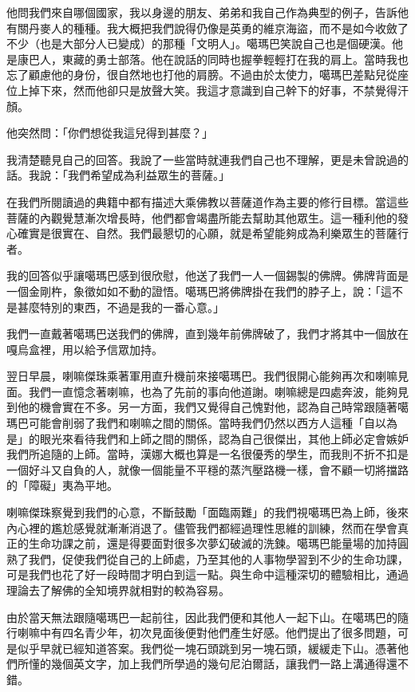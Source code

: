 他問我們來自哪個國家，我以身邊的朋友、弟弟和我自己作為典型的例子，告訴他有關丹麥人的種種。我大概把我們說得仍像是英勇的維京海盜，而不是如今收斂了不少（也是大部分人已變成）的那種「文明人」。噶瑪巴笑說自己也是個硬漢。他是康巴人，東藏的勇士部落。他在說話的同時也握拳輕輕打在我的肩上。當時我也忘了顧慮他的身份，很自然地也打他的肩膀。不過由於太使力，噶瑪巴差點兒從座位上掉下來，然而他卻只是放聲大笑。我這才意識到自己幹下的好事，不禁覺得汗顏。

他突然問：「你們想從我這兒得到甚麼？」

我清楚聽見自己的回答。我說了一些當時就連我們自己也不理解，更是未曾說過的話。我說：「我們希望成為利益眾生的菩薩。」

在我們所閱讀過的典籍中都有描述大乘佛教以菩薩道作為主要的修行目標。當這些菩薩的內觀覺慧漸次增長時，他們都會竭盡所能去幫助其他眾生。這一種利他的發心確實是很實在、自然。我們最懇切的心願，就是希望能夠成為利樂眾生的菩薩行者。

我的回答似乎讓噶瑪巴感到很欣慰，他送了我們一人一個錫製的佛牌。佛牌背面是一個金剛杵，象徵如如不動的證悟。噶瑪巴將佛牌掛在我們的脖子上，說：「這不是甚麼特別的東西，不過是我的一番心意。」

我們一直戴著噶瑪巴送我們的佛牌，直到幾年前佛牌破了，我們才將其中一個放在嘎烏盒裡，用以給予信眾加持。

翌日早晨，喇嘛傑珠乘著軍用直升機前來接噶瑪巴。我們很開心能夠再次和喇嘛見面。我們一直憶念著喇嘛，也為了先前的事向他道謝。喇嘛總是四處奔波，能夠見到他的機會實在不多。另一方面，我們又覺得自己愧對他，認為自己時常跟隨著噶瑪巴可能會削弱了我們和喇嘛之間的關係。當時我們仍然以西方人這種「自以為是」的眼光來看待我們和上師之間的關係，認為自己很傑出，其他上師必定會嫉妒我們所追隨的上師。當時，漢娜大概也算是一名很優秀的學生，而我則不折不扣是一個好斗又自負的人，就像一個能量不平穩的蒸汽壓路機一樣，會不顧一切將擋路的「障礙」夷為平地。

喇嘛傑珠察覺到我們的心意，不斷鼓勵「面臨兩難」的我們視噶瑪巴為上師，後來內心裡的尷尬感覺就漸漸消退了。儘管我們都經過理性思維的訓練，然而在學會真正的生命功課之前，還是得要面對很多次夢幻破滅的洗鍊。噶瑪巴能量場的加持圓熟了我們，促使我們從自己的上師處，乃至其他的人事物學習到不少的生命功課，可是我們也花了好一段時間才明白到這一點。與生命中這種深切的體驗相比，通過理論去了解佛的全知境界就相對的較為容易。

由於當天無法跟隨噶瑪巴一起前往，因此我們便和其他人一起下山。在噶瑪巴的隨行喇嘛中有四名青少年，初次見面後便對他們產生好感。他們提出了很多問題，可是似乎早就已經知道答案。我們從一塊石頭跳到另一塊石頭，緩緩走下山。憑著他們所懂的幾個英文字，加上我們所學過的幾句尼泊爾話，讓我們一路上溝通得還不錯。

